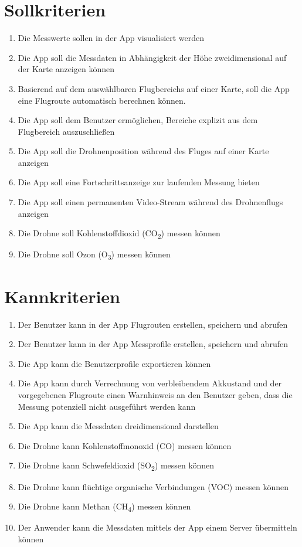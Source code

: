 \section{Sollkriterien}\label{sec:Sollkriterien}
\begin{enumerate}[label=\roman*.]
	\item Die Messwerte sollen in der App visualisiert werden 	
	\item Die App soll die Messdaten in Abhängigkeit der Höhe zweidimensional auf der Karte anzeigen können
	\item Basierend auf dem auswählbaren Flugbereichs auf einer Karte, soll die App eine Flugroute automatisch berechnen können.
	\item Die App soll dem Benutzer ermöglichen, Bereiche explizit aus dem Flugbereich auszuschließen
	\item Die App soll die Drohnenposition während des Fluges auf einer Karte anzeigen
	\item Die App soll eine Fortschrittsanzeige zur laufenden Messung bieten
	\item Die App soll einen permanenten Video-Stream während des Drohnenflugs anzeigen
	\item Die Drohne soll Kohlenstoffdioxid (CO\textsubscript{2}) messen können
	\item Die Drohne soll Ozon (O\textsubscript{3}) messen können	
\end{enumerate}


\section{Kannkriterien}\label{sec:Kannkriterien}
\begin{enumerate}[label=\roman*.]
	\item Der Benutzer kann in der App Flugrouten erstellen, speichern und abrufen 
	\item Der Benutzer kann in der App Messprofile erstellen, speichern und abrufen 
	\item Die App kann die Benutzerprofile exportieren können
	\item Die App kann durch Verrechnung von verbleibendem Akkustand und der vorgegebenen Flugroute einen Warnhinweis an den Benutzer geben, dass die Messung potenziell nicht ausgeführt werden kann
	\item Die App kann die Messdaten dreidimensional darstellen
	\item Die Drohne kann Kohlenstoffmonoxid (CO) messen können
	\item Die Drohne kann Schwefeldioxid (SO\textsubscript{2}) messen können
	\item Die Drohne kann flüchtige organische Verbindungen (VOC) messen können
	\item Die Drohne kann Methan (CH\textsubscript{4}) messen können	
	\item Der Anwender kann die Messdaten mittels der App einem Server übermitteln können	
\end{enumerate}


